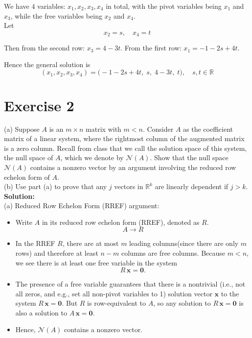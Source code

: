 \documentclass{article}
\begin{document}
We have 4 variables: \(x_1,x_2,x_3,x_4\) in total, with the pivot variables being \(x_1\) and \(x_3\), while the free variables being \(x_2\) and \(x_4\). \\

Let 
\[
x_2 = s,
\quad
x_4 = t
\]

Then from the second row: \(x_3 = 4 - 3t\).  
From the first row: \(x_1 = -1 - 2s + 4t\).

Hence the general solution is
\[
(x_1, x_2, x_3, x_4)
=
\bigl(-1 - 2s + 4t,\; s,\; 4 - 3t,\; t\bigr), \quad s,t \in \mathbb{R}
\]

\newpage

\section*{Exercise 2}
(a) Suppose $A$ is an $m \times n$ matrix with $m < n$. Consider $A$ as the coefficient matrix of a linear system, where the rightmost column of the augmented matrix is a zero column. Recall from class that we call the solution space of this system, the null space of $A$, which we denote by $\mathcal{N}(A)$. Show that the null space $\mathcal{N}(A)$ contains a nonzero vector by an argument involving the reduced row echelon form of $A$. \\

\noindent
(b) Use part (a) to prove that any $j$ vectors in $\mathbb{R}^k$ are linearly dependent if $j > k$. \\

\textbf{Solution:} \\

(a) Reduced Row Echelon Form (RREF) argument:

\begin{itemize}
\item Write $A$ in its reduced row echelon form (RREF), denoted as $R$.
\[
A \longrightarrow R
\]
\item In the RREF $R$, there are at most $m$ leading columns(since there are only $m$ rows) and therefore at least $n - m$ columns are free columns. Because $m < n$, we see there is at least one free variable in the system
\[
R\,\mathbf{x} = \mathbf{0}.
\]
\item The presence of a free variable guarantees that there is a nontrivial (i.e., not all zeros, and e.g., set all non-pivot variables to 1) solution vector $\mathbf{x}$ to the system $R\,\mathbf{x} = \mathbf{0}$. But $R$ is row-equivalent to $A$, so any solution to $R\,\mathbf{x} = \mathbf{0}$ is also a solution to $A\,\mathbf{x} = \mathbf{0}$.
\item Hence, $\mathcal{N}(A)$ contains a nonzero vector.
\end{itemize}
\end{document}
